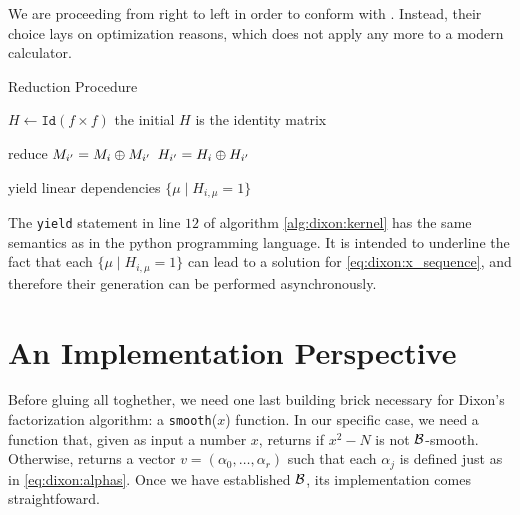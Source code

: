 \begin{remark}
  We are proceeding from right to left in order to conform with
  \cite{morrison-brillhart}.
  Instead, their choice lays on optimization reasons, which does
  not apply any more to a modern calculator.
\end{remark}

\begin{algorithm}
  \caption{Reduction Procedure  \label{alg:dixon:kernel}}
  \begin{algorithmic}[1]
    \State $H \gets \texttt{Id}(f \times f)$
    \Comment the initial $H$ is the identity matrix

    \Comment reduce
              \State $M_{i'} = M_i \oplus M_{i'}$
              \State $H_{i'} = H_i \oplus H_{i'}$
            \EndIf
          \EndFor
          \State {}
        \EndIf
      \EndFor
    \EndFor

    \Comment yield  linear dependencies
         $\{\mu  \mid H_{i,\mu} = 1\}$
      \EndIf
    \EndFor
    \EndFunction
  \end{algorithmic}
\end{algorithm}

\begin{remark}
The \texttt{yield} statement in line $12$ of algorithm \ref{alg:dixon:kernel}
has the same semantics as in the python programming language.
It is intended to underline the fact that each $\{\mu  \mid H_{i,\mu} = 1\}$
can lead to a solution for \ref{eq:dixon:x_sequence}, and therefore their
generation can be performed asynchronously.
\end{remark}


\section{An Implementation Perspective}

Before gluing all toghether, we need one last building brick necessary for
Dixon's factorization algorithm: a \texttt{smooth}($x$) function. In our
specific case, we need a function that, given as input a number $x$, returns
 if $x^2 -N$ is not $\mathcal{B}$-smooth. Otherwise,
returns a vector $v = (\alpha_0, \ldots, \alpha_r)$ such that each $\alpha_j$ is
defined just as in \ref{eq:dixon:alphas}. Once we have established $\mathcal{B}$, its
implementation comes straightfoward.

